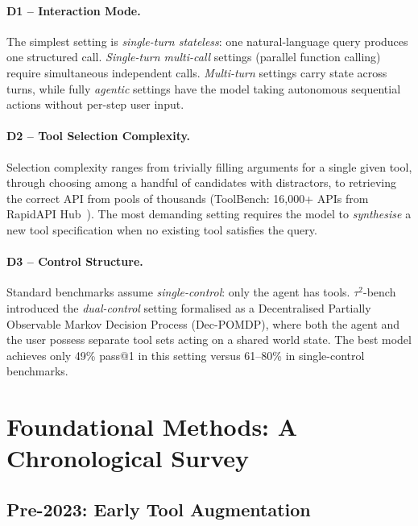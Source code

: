 \documentclass[11pt]{article}
\newcommand{\tautwobench}{$\tau^2$-bench}
\begin{document}
\paragraph{D1 -- Interaction Mode.}
The simplest setting is \emph{single-turn stateless}: one natural-language query produces one
structured call. \emph{Single-turn multi-call} settings (parallel function calling) require
simultaneous independent calls. \emph{Multi-turn} settings carry state across turns, while fully
\emph{agentic} settings have the model taking autonomous sequential actions without per-step user
input.

\paragraph{D2 -- Tool Selection Complexity.}
Selection complexity ranges from trivially filling arguments for a single given tool, through
choosing among a handful of candidates with distractors, to retrieving the correct API from pools of
thousands (ToolBench: 16,000+ APIs from RapidAPI Hub~\citep{qin2024toolllm}). The most demanding
setting requires the model to \emph{synthesise} a new tool specification when no existing tool
satisfies the query.

\paragraph{D3 -- Control Structure.}
Standard benchmarks assume \emph{single-control}: only the agent has tools.
\tautwobench{}~\citep{barres2025tau2} introduced the \emph{dual-control} setting formalised as a
Decentralised Partially Observable Markov Decision Process (Dec-POMDP), where both the agent and the
user possess separate tool sets acting on a shared world state. The best model achieves only 49\%
pass@1 in this setting versus 61--80\% in single-control benchmarks.

\section{Foundational Methods: A Chronological Survey}
\label{sec:methods}

\subsection{Pre-2023: Early Tool Augmentation}
\end{document}
